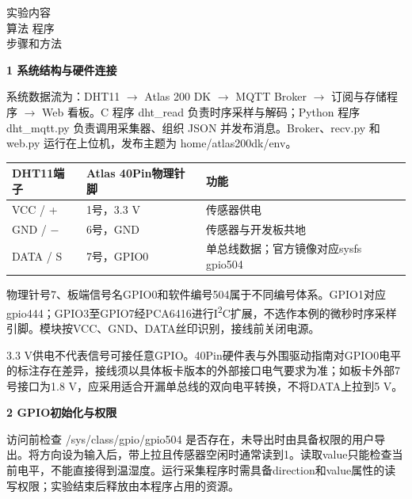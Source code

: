 \documentclass[UTF8,zihao=-4,a4paper]{ctexart}
\begin{document}
\begin{reprow}{实验内容\\
算法 程序\\
步骤和方法}
\par\medskip
\noindent\textbf{1 系统结构与硬件连接}\par\nobreak
系统数据流为：DHT11 \ensuremath{\rightarrow} Atlas 200 DK \ensuremath{\rightarrow} MQTT Broker \ensuremath{\rightarrow} 订阅与存储程序 \ensuremath{\rightarrow} Web 看板。C 程序 dht\_read 负责时序采样与解码；Python 程序 dht\_mqtt.py 负责调用采集器、组织 JSON 并发布消息。Broker、recv.py 和 web.py 运行在上位机，发布主题为 home/atlas200dk/env。\par

\par\begingroup\small
\renewcommand{\arraystretch}{1.18}
\noindent\begin{tabularx}{\linewidth}{|Y{0.4958678}|Y{0.9917355}|Y{1.5123967}|}
\hline
\textbf{DHT11端子} & \textbf{Atlas 40Pin物理针脚} & \textbf{功能} \\ \hline
VCC / + & 1号，3.3 V & 传感器供电 \\ \hline
GND / \ensuremath{-} & 6号，GND & 传感器与开发板共地 \\ \hline
DATA / S & 7号，GPIO0 & 单总线数据；官方镜像对应sysfs gpio504 \\ \hline
\end{tabularx}\par\endgroup
\smallskip
物理针号7、板端信号名GPIO0和软件编号504属于不同编号体系。GPIO1对应gpio444；GPIO3至GPIO7经PCA6416进行I\textsuperscript{2}C扩展，不选作本例的微秒时序采样引脚。模块按VCC、GND、DATA丝印识别，接线前关闭电源。\par

3.3 V供电不代表信号可接任意GPIO。40Pin硬件表与外围驱动指南对GPIO0电平的标注存在差异，接线须以具体板卡版本的外部接口电气要求为准；如板卡外部7号接口为1.8 V，应采用适合开漏单总线的双向电平转换，不将DATA上拉到5 V。\par

\par\medskip
\noindent\textbf{2 GPIO初始化与权限}\par\nobreak
访问前检查 /sys/class/gpio/gpio504 是否存在，未导出时由具备权限的用户导出。将方向设为输入后，带上拉且传感器空闲时通常读到1。读取value只能检查当前电平，不能直接得到温湿度。运行采集程序时需具备direction和value属性的读写权限；实验结束后释放由本程序占用的资源。\par


\end{reprow}
\end{document}
